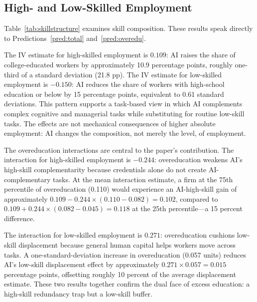 \documentclass[12pt,a4paper]{article}
\theoremstyle{predstyle}
\theoremstyle{plain}
\begin{document}
\subsection{High- and Low-Skilled Employment}

Table~\ref{tab:skillstructure} examines skill composition. These results speak directly to Predictions~\ref{pred:total} and~\ref{pred:overedu}.

The IV estimate for high-skilled employment is \(0.109\): AI raises the share of college-educated workers by approximately 10.9 percentage points, roughly one-third of a standard deviation (21.8 pp). The IV estimate for low-skilled employment is \(-0.150\): AI reduces the share of workers with high-school education or below by 15 percentage points, equivalent to 0.61 standard deviations. This pattern supports a task-based view in which AI complements complex cognitive and managerial tasks while substituting for routine low-skill tasks. The effects are not mechanical consequences of higher absolute employment: AI changes the composition, not merely the level, of employment.

The overeducation interactions are central to the paper's contribution. The interaction for high-skilled employment is \(-0.244\): overeducation weakens AI's high-skill complementarity because credentials alone do not create AI-complementary tasks. At the mean interaction estimate, a firm at the 75th percentile of overeducation (0.110) would experience an AI-high-skill gain of approximately \(0.109 - 0.244 \times (0.110 - 0.082) = 0.102\), compared to \(0.109 + 0.244 \times (0.082 - 0.045) = 0.118\) at the 25th percentile---a 15 percent difference.

The interaction for low-skilled employment is \(0.271\): overeducation cushions low-skill displacement because general human capital helps workers move across tasks. A one-standard-deviation increase in overeducation (0.057 units) reduces AI's low-skill displacement effect by approximately \(0.271 \times 0.057 = 0.015\) percentage points, offsetting roughly 10 percent of the average displacement estimate. These two results together confirm the dual face of excess education: a high-skill redundancy trap but a low-skill buffer.
\end{document}
